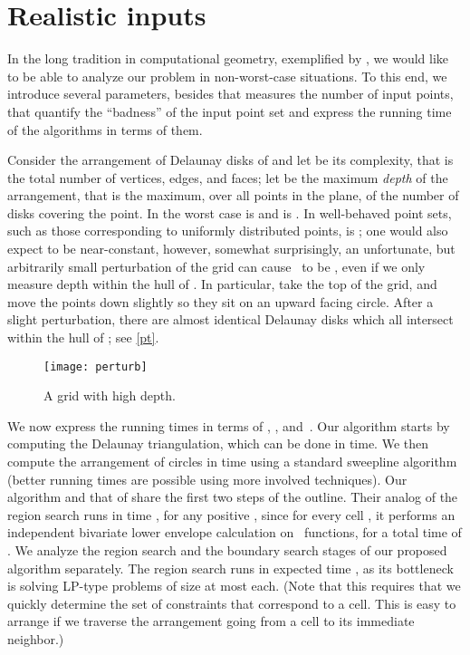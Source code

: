 \documentclass{cccg13}
\begin{document}
\section{Realistic inputs}\label{sec:realistic}
In the long tradition in computational geometry, exemplified by \cite{realistic}, we would like to be able to analyze our problem in non-worst-case situations.  To this end, we introduce several parameters, besides  that measures the number of input points, that quantify the ``badness'' of the input point set and express the running time of the algorithms in terms of them. 

Consider the arrangement  of Delaunay disks of  and let  be its complexity, that is the total number of vertices, edges, and faces; let  be the maximum \emph{depth} of the arrangement, that is the maximum, over all points in the plane, of the number of disks covering the point. In the worst case  is  and  is .  In well-behaved point sets, such as those corresponding to uniformly distributed points,  is ; one would also
expect  to be near-constant, however, somewhat surprisingly, an unfortunate, but arbitrarily small perturbation of the  grid can cause~ to be , even if we only measure depth within the hull of .  In particular, take the top of the grid, and move the points down slightly so they sit on an upward facing circle.  After a slight perturbation, there are  almost identical Delaunay disks which all intersect within the hull of ; see \autoref{pt}.
\begin{figure}
  \centering
  \texttt{[image: perturb]}
  \caption{\label{pt}A grid with high depth.}
\end{figure}

We now express the running times in terms of , , and~.  Our algorithm starts by computing the Delaunay triangulation, which can be done in  time.  We then compute the arrangement of circles in  time using a standard sweepline algorithm (better running times are possible using more involved techniques).  Our algorithm and that of \cite{orig} share the first two steps of the outline.  Their analog of the region search runs in time , for any positive , since for every cell , it performs an independent bivariate lower envelope calculation on~ functions, for a total time of .  We analyze the region search and the boundary search stages of our proposed algorithm separately.  The region search runs in expected time , as its bottleneck is solving  LP-type problems of size at most  each.  (Note that this requires that we quickly determine the set of constraints that correspond to a cell.  This is easy to arrange if we traverse the arrangement going from a cell to its immediate neighbor.)
\end{document}
